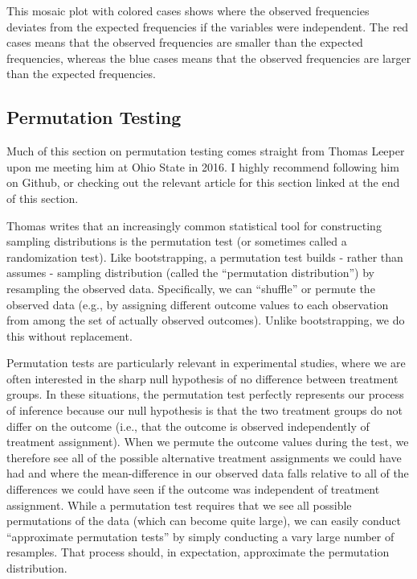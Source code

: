 \documentclass[12pt]{article}\usepackage[]{graphicx}\usepackage[]{color}
\newenvironment{knitrout}{}{} %
\begin{document}
\begin{flushleft}
\begin{knitrout}
\end{knitrout}

This mosaic plot with colored cases shows where the observed frequencies deviates from the expected frequencies if the variables were independent. The red cases means that the observed frequencies are smaller than the expected frequencies, whereas the blue cases means that the observed frequencies are larger than the expected frequencies.


\subsection{Permutation Testing}


Much of this section on permutation testing comes straight from Thomas Leeper upon me meeting him at Ohio State in 2016. I highly recommend following him on Github, or checking out the relevant article for this section linked at the end of this section.

Thomas writes that an increasingly common statistical tool for constructing sampling distributions is the permutation test (or sometimes called a randomization test). Like bootstrapping, a permutation test builds - rather than assumes - sampling distribution (called the ``permutation distribution'') by resampling the observed data. Specifically, we can ``shuffle'' or permute the observed data (e.g., by assigning different outcome values to each observation from among the set of actually observed outcomes). Unlike bootstrapping, we do this without replacement.

Permutation tests are particularly relevant in experimental studies, where we are often interested in the sharp null hypothesis of no difference between treatment groups. In these situations, the permutation test perfectly represents our process of inference because our null hypothesis is that the two treatment groups do not differ on the outcome (i.e., that the outcome is observed independently of treatment assignment). When we permute the outcome values during the test, we therefore see all of the possible alternative treatment assignments we could have had and where the mean-difference in our observed data falls relative to all of the differences we could have seen if the outcome was independent of treatment assignment. While a permutation test requires that we see all possible permutations of the data (which can become quite large), we can easily conduct ``approximate permutation tests'' by simply conducting a vary large number of resamples. That process should, in expectation, approximate the permutation distribution.


\end{flushleft}
\end{document}

